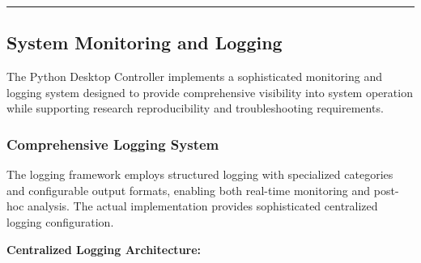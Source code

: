 \documentclass[11pt,a4paper]{article}
\begin{document}
\hrule

\subsection{System Monitoring and Logging}

The Python Desktop Controller implements a sophisticated monitoring and logging system designed to provide comprehensive
visibility into system operation while supporting research reproducibility and troubleshooting requirements.

\subsubsection{Comprehensive Logging System}

The logging framework employs structured logging with specialized categories and configurable output formats, enabling
both real-time monitoring and post-hoc analysis. The actual implementation provides sophisticated centralized logging
configuration.

\textbf{Centralized Logging Architecture:}
\end{document}

